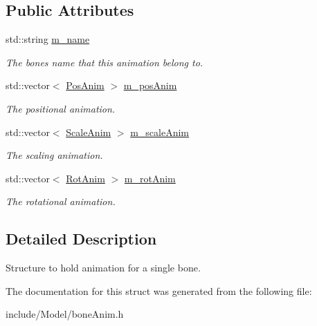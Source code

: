 \subsection*{Public Attributes}
\begin{DoxyCompactItemize}
\item 
std\+::string \hyperlink{structBoneAnim_aa9544d0fb5fee3778cb44c57056d8319}{m\+\_\+name}\hypertarget{structBoneAnim_aa9544d0fb5fee3778cb44c57056d8319}{}\label{structBoneAnim_aa9544d0fb5fee3778cb44c57056d8319}

\begin{DoxyCompactList}\small\item\em The bones name that this animation belong to. \end{DoxyCompactList}\item 
std\+::vector$<$ \hyperlink{structPosAnim}{Pos\+Anim} $>$ \hyperlink{structBoneAnim_ace7f3492a1e772ac72b93d8caaa106c3}{m\+\_\+pos\+Anim}\hypertarget{structBoneAnim_ace7f3492a1e772ac72b93d8caaa106c3}{}\label{structBoneAnim_ace7f3492a1e772ac72b93d8caaa106c3}

\begin{DoxyCompactList}\small\item\em The positional animation. \end{DoxyCompactList}\item 
std\+::vector$<$ \hyperlink{structScaleAnim}{Scale\+Anim} $>$ \hyperlink{structBoneAnim_a4ac9a5f4411f0920a4fb142367a65608}{m\+\_\+scale\+Anim}\hypertarget{structBoneAnim_a4ac9a5f4411f0920a4fb142367a65608}{}\label{structBoneAnim_a4ac9a5f4411f0920a4fb142367a65608}

\begin{DoxyCompactList}\small\item\em The scaling animation. \end{DoxyCompactList}\item 
std\+::vector$<$ \hyperlink{structRotAnim}{Rot\+Anim} $>$ \hyperlink{structBoneAnim_aac216783cc7cd97adc80d52db2d9cd14}{m\+\_\+rot\+Anim}\hypertarget{structBoneAnim_aac216783cc7cd97adc80d52db2d9cd14}{}\label{structBoneAnim_aac216783cc7cd97adc80d52db2d9cd14}

\begin{DoxyCompactList}\small\item\em The rotational animation. \end{DoxyCompactList}\end{DoxyCompactItemize}


\subsection{Detailed Description}
Structure to hold animation for a single bone. 

The documentation for this struct was generated from the following file\+:\begin{DoxyCompactItemize}
\item 
include/\+Model/bone\+Anim.\+h\end{DoxyCompactItemize}

